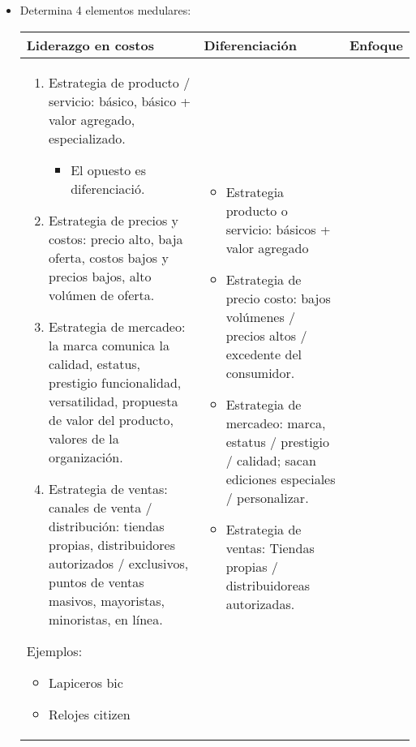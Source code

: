 \begin{itemize}
    \item Determina 4 elementos medulares:
        \begin{center}
           \begin{supertabular}{ | p{6cm} | p{6cm} | p{6cm} |}
               \hline
                    Liderazgo en costos & 
                    Diferenciación &
                    Enfoque
                       \\
               \hline
                \begin{enumerate}
                    \item Estrategia de producto / servicio: básico, básico + valor agregado, especializado.
                        \begin{itemize}
                            \item El opuesto es diferenciació.
                        \end{itemize}
                    \item Estrategia de precios y costos: precio alto, baja oferta, costos bajos y precios bajos, alto volúmen de oferta.
                    \item Estrategia de mercadeo: la marca comunica la calidad, estatus, prestigio funcionalidad, versatilidad, propuesta de valor del producto, valores de la organización.
                    \item Estrategia de ventas: canales de venta / distribución: tiendas propias, distribuidores autorizados / exclusivos, puntos de ventas masivos, mayoristas, minoristas, en línea.
                \end{enumerate}
                Ejemplos:
                    \begin{itemize}
                        \item Lapiceros bic 
                        \item Relojes citizen
                    \end{itemize}
                & 
                \begin{itemize}
                    \item Estrategia producto o servicio: básicos +  valor agregado
                    \item Estrategia de precio costo: bajos volúmenes / precios altos / excedente del consumidor.
                    \item Estrategia de mercadeo: marca, estatus / prestigio / calidad; sacan ediciones especiales / personalizar.
                    \item Estrategia de ventas: Tiendas propias / distribuidoreas autorizadas. 

\end{itemize}
\end{supertabular}
\end{center}
\end{itemize}

